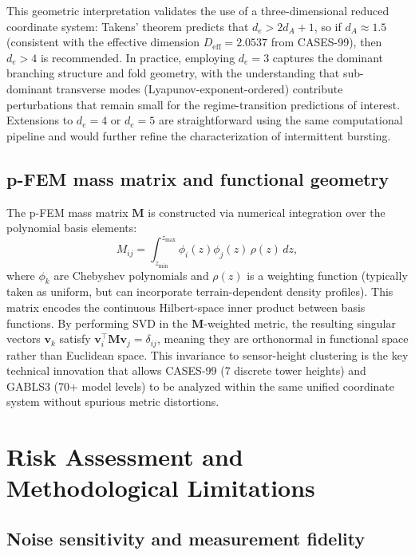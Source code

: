 \documentclass[12pt,a4paper]{article}
\newcommand{\vect}[1]{\mathbf{#1}}
\newcommand{\mat}[1]{\mathbf{#1}}
\begin{document}
This geometric interpretation validates the use of a three-dimensional reduced coordinate system: Takens' theorem predicts that $d_e > 2 d_A + 1$, so if $d_A \approx 1.5$ (consistent with the effective dimension $D_{\text{eff}} = 2.0537$ from CASES-99), then $d_e > 4$ is recommended. In practice, employing $d_e = 3$ captures the dominant branching structure and fold geometry, with the understanding that sub-dominant transverse modes (Lyapunov-exponent-ordered) contribute perturbations that remain small for the regime-transition predictions of interest. Extensions to $d_e = 4$ or $d_e = 5$ are straightforward using the same computational pipeline and would further refine the characterization of intermittent bursting.

\subsection{p-FEM mass matrix and functional geometry}

The p-FEM mass matrix $\mat{M}$ is constructed via numerical integration over the polynomial basis elements:
\begin{equation}
M_{ij} = \int_{z_{\text{min}}}^{z_{\text{max}}} \phi_i(z) \phi_j(z) \, \rho(z) \, dz,
\end{equation}
where $\phi_k$ are Chebyshev polynomials and $\rho(z)$ is a weighting function (typically taken as uniform, but can incorporate terrain-dependent density profiles). This matrix encodes the continuous Hilbert-space inner product between basis functions. By performing SVD in the $\mat{M}$-weighted metric, the resulting singular vectors $\vect{v}_k$ satisfy $\vect{v}_i^\top \mat{M} \vect{v}_j = \delta_{ij}$, meaning they are orthonormal in functional space rather than Euclidean space. This invariance to sensor-height clustering is the key technical innovation that allows CASES-99 (7 discrete tower heights) and GABLS3 (70+ model levels) to be analyzed within the same unified coordinate system without spurious metric distortions.

\section{Risk Assessment and Methodological Limitations}

\subsection{Noise sensitivity and measurement fidelity}
\end{document}
